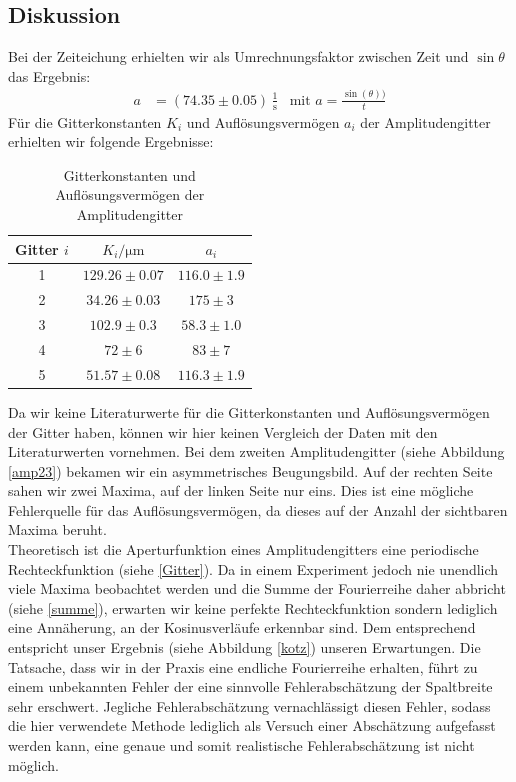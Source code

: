 \documentclass[12pt]{article}
\begin{document}
\newpage
\subsection{Diskussion\label{BOOOOOMMMM!!!!!!!!!}} 

Bei der Zeiteichung erhielten wir als Umrechnungsfaktor zwischen Zeit und $\sin\theta$ das Ergebnis:
\begin{align*}
a &= (74.35\pm0.05)\,\frac1{\mathrm{s}}&
\text{mit } a = \frac{\sin(\theta))}{t}
\end{align*}
Für die Gitterkonstanten $K_i$ und Auflösungsvermögen $a_i$ der Amplitudengitter erhielten wir folgende Ergebnisse:

\begin{table}[h!]
	\centering
	\begin{tabular}{c|c|c}
		Gitter $i$&$K_i / \mathrm{\mu m}$&$a_i$\\\hline
		1&$129.26\pm0.07$&$116.0\pm1.9$\\
		2&$ 34.26\pm0.03$&$175  \pm3  $\\
		3&$102.9 \pm0.3 $&$ 58.3\pm1.0$\\
		4&$ 72   \pm6   $&$ 83  \pm7  $\\
		5&$ 51.57\pm0.08$&$116.3\pm1.9$		
	\end{tabular}
	\caption{\label{ergebnisse}Gitterkonstanten und Auflösungsvermögen der Amplitudengitter}
\end{table}

Da wir keine Literaturwerte für die Gitterkonstanten und Auflösungsvermögen der Gitter haben, können wir hier keinen Vergleich der Daten mit den Literaturwerten vornehmen. Bei dem zweiten Amplitudengitter (siehe Abbildung \ref{amp23}) bekamen wir ein asymmetrisches Beugungsbild. Auf der rechten Seite sahen wir zwei Maxima, auf der linken Seite nur eins. Dies ist eine mögliche Fehlerquelle für das Auflösungsvermögen, da dieses auf der Anzahl der sichtbaren Maxima beruht.\\

Theoretisch ist die Aperturfunktion eines Amplitudengitters eine periodische Rechteckfunktion (siehe \ref{Gitter}). Da in einem Experiment jedoch nie unendlich viele Maxima beobachtet werden und die Summe der Fourierreihe daher abbricht (siehe \ref{summe}), erwarten wir keine perfekte Rechteckfunktion sondern lediglich eine Annäherung, an der Kosinusverläufe erkennbar sind. Dem entsprechend entspricht unser Ergebnis (siehe Abbildung \ref{kotz}) unseren Erwartungen. Die Tatsache, dass wir in der Praxis eine endliche Fourierreihe erhalten, führt zu einem unbekannten Fehler der eine sinnvolle Fehlerabschätzung der Spaltbreite sehr erschwert. Jegliche Fehlerabschätzung vernachlässigt diesen Fehler, sodass die hier verwendete Methode lediglich als Versuch einer Abschätzung aufgefasst werden kann, eine genaue und somit realistische Fehlerabschätzung ist nicht möglich.
\newpage
\end{document}
